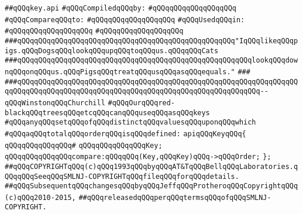 \label{src/lib/src/key.api}
\verb|##qQQqkey.api|\newline
\newline
\verb|#qQQqCompiledqQQqby:|\newline
\verb|#qQQqqQQqqQQqqQQqqQQq|\newline
\newline
\verb|#qQQqCompareqQQqto:|\newline
\verb|#qQQqqQQqqQQqqQQqqQQq|\newline
\newline
\verb|#qQQqUsedqQQqin:|\newline
\verb|#qQQqqQQqqQQqqQQqqQQq|\newline
\verb|#qQQqqQQqqQQqqQQqqQQq|\newline
\newline
\newline
\newline
\verb|###qQQqqQQqqQQqqQQqqQQqqQQqqQQqqQQqqQQqqQQqqQQqqQQqqQQq"IqQQqlikeqQQqpigs.qQQqDogsqQQqlookqQQqupqQQqtoqQQqus.qQQqqQQqCats|\newline
\verb|###qQQqqQQqqQQqqQQqqQQqqQQqqQQqqQQqqQQqqQQqqQQqqQQqqQQqqQQqlookqQQqdownqQQqonqQQqus.qQQqPigsqQQqtreatqQQqusqQQqasqQQqequals."|\newline
\verb|###|\newline
\verb|###qQQqqQQqqQQqqQQqqQQqqQQqqQQqqQQqqQQqqQQqqQQqqQQqqQQqqQQqqQQqqQQqqQQqqQQqqQQqqQQqqQQqqQQqqQQqqQQqqQQqqQQqqQQqqQQqqQQqqQQqqQQqqQQq--qQQqWinstonqQQqChurchill|\newline
\newline
\newline
\newline
\verb|#qQQqOurqQQqred-blackqQQqtreesqQQqetcqQQqcanqQQquseqQQqasqQQqkeys|\newline
\verb|#qQQqanyqQQqsetqQQqofqQQqdistinctqQQqvaluesqQQquponqQQqwhich|\newline
\verb|#qQQqaqQQqtotalqQQqorderqQQqisqQQqdefined:|\newline
\newline
\newline
\verb|apiqQQqKeyqQQq{|\newline
\verb|qQQqqQQqqQQqqQQq#|\newline
\verb|qQQqqQQqqQQqqQQqKey;|\newline
\verb|qQQqqQQqqQQqqQQqcompare:qQQqqQQq(Key,qQQqKey)qQQq->qQQqOrder;|\newline
\verb|};|\newline
\newline
\newline
\verb|##qQQqCOPYRIGHTqQQq(c)qQQq1993qQQqbyqQQqAT&TqQQqBellqQQqLaboratories.qQQqqQQqSeeqQQqSMLNJ-COPYRIGHTqQQqfileqQQqforqQQqdetails.|\newline
\verb|##qQQqSubsequentqQQqchangesqQQqbyqQQqJeffqQQqProtheroqQQqCopyrightqQQq(c)qQQq2010-2015,|\newline
\verb|##qQQqreleasedqQQqperqQQqtermsqQQqofqQQqSMLNJ-COPYRIGHT.|\newline

